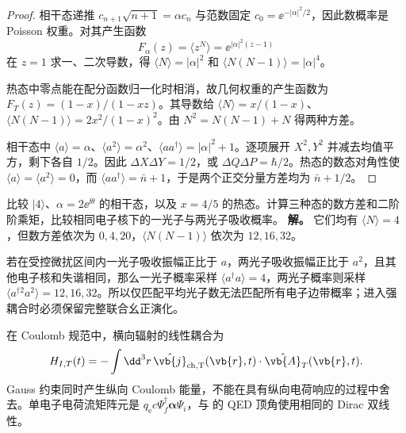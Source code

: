 \begin{proof}
相干态递推 $c_{n+1}\sqrt{n+1}=\alpha c_n$ 与范数固定 $c_0=\ee^{-|\alpha|^2/2}$，因此数概率是 Poisson 权重。对其产生函数
\begin{equation*}
 F_\alpha(z)=\langle z^N\rangle=\ee^{|\alpha|^2(z-1)}
\end{equation*}
在 $z=1$ 求一、二次导数，得 $\langle N\rangle=|\alpha|^2$ 和 $\langle N(N-1)\rangle=|\alpha|^4$。

热态中零点能在配分函数归一化时相消，故几何权重的产生函数为 $F_T(z)=(1-x)/(1-xz)$。其导数给 $\langle N\rangle=x/(1-x)$、$\langle N(N-1)\rangle=2x^2/(1-x)^2$。由 $N^2=N(N-1)+N$ 得两种方差。

相干态中 $\langle a\rangle=\alpha$、$\langle a^2\rangle=\alpha^2$、$\langle aa^\dagger\rangle=|\alpha|^2+1$。逐项展开 $X^2,Y^2$ 并减去均值平方，剩下各自 $1/2$。因此 $\Delta X\Delta Y=1/2$，或 $\Delta Q\Delta P=\hbar/2$。热态的数态对角性使 $\langle a\rangle=\langle a^2\rangle=0$，而 $\langle aa^\dagger\rangle=\bar n+1$，于是两个正交分量方差均为 $\bar n+1/2$。
\end{proof}

\begin{exbox}
比较 $|4\rangle$、$\alpha=2\ee^{\ii\theta}$ 的相干态，以及 $x=4/5$ 的热态。计算三种态的数方差和二阶阶乘矩，比较相同电子核下的一光子与两光子吸收概率。
\textbf{解。} 它们均有 $\langle N\rangle=4$，但数方差依次为 $0,4,20$，$\langle N(N-1)\rangle$ 依次为 $12,16,32$。

若在受控微扰区间内一光子吸收振幅正比于 $a$，两光子吸收振幅正比于 $a^2$，且其他电子核和失谐相同，那么一光子概率采样 $\langle a^\dagger a\rangle=4$，两光子概率则采样 $\langle a^{\dagger2}a^2\rangle=12,16,32$。所以仅匹配平均光子数无法匹配所有电子边带概率；进入强耦合时必须保留完整联合幺正演化。
\end{exbox}

\begin{definition}[电子电流与量子辐射场的耦合]
在 Coulomb 规范中，横向辐射的线性耦合为
\begin{equation}
 H_{I,T}(t)=-\int\dd^3r\,
 \hat{\vb{j}}_{\rm ch,T}(\vb{r},t)\cdot\hat{\vb{A}}_T(\vb{r},t).
 \label{eq:feqo-current-field-coupling}
\end{equation}
Gauss 约束同时产生纵向 Coulomb 能量，不能在具有纵向电荷响应的过程中舍去。单电子电荷流矩阵元是 $q_{\mathrm e}c\Psi_f^\dagger\boldsymbol\alpha\Psi_i$，与 的 QED 顶角使用相同的 Dirac 双线性。
\end{definition}
